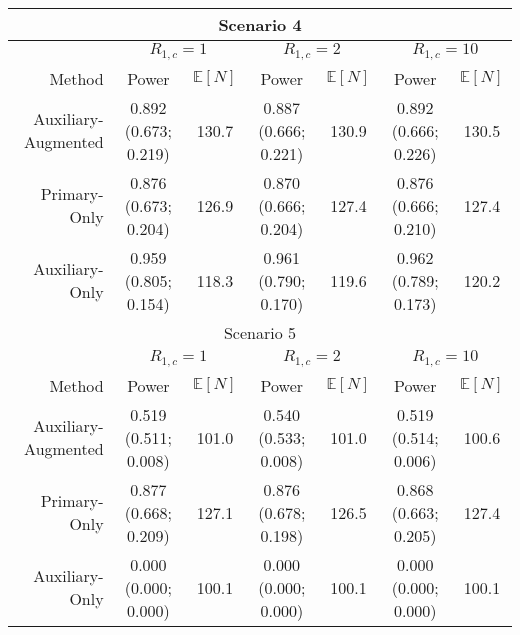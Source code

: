 \begin{tabular}{r|cc|cc|cc}
\bottomrule 
\multicolumn{7}{c}{Scenario 4}\\ 
\midrule 
& \multicolumn{2}{c}{$R_{1,c}= 1$} & \multicolumn{2}{c}{$R_{1,c} = 2$} & \multicolumn{2}{c}{$R_{1,c} = 10$} \\ 
Method &  Power &   $\mathbb E[N]$ &
               Power &   $\mathbb E[N]$ &
               Power &   $\mathbb E[N]$  \\ 
Auxiliary-Augmented &0.892  (0.673; 0.219) & 130.7 &0.887  (0.666; 0.221) & 130.9 &0.892  (0.666; 0.226) & 130.5 \\ 
Primary-Only &0.876  (0.673; 0.204) & 126.9 &0.870  (0.666; 0.204) & 127.4 &0.876  (0.666; 0.210) & 127.4 \\ 
Auxiliary-Only &0.959  (0.805; 0.154) & 118.3 &0.961  (0.790; 0.170) & 119.6 &0.962  (0.789; 0.173) & 120.2 \\ 
\bottomrule 
\multicolumn{7}{c}{Scenario 5}\\ 
\midrule 
& \multicolumn{2}{c}{$R_{1,c}= 1$} & \multicolumn{2}{c}{$R_{1,c} = 2$} & \multicolumn{2}{c}{$R_{1,c} = 10$} \\ 
Method &  Power &   $\mathbb E[N]$ &
               Power &   $\mathbb E[N]$ &
               Power &   $\mathbb E[N]$  \\ 
Auxiliary-Augmented &0.519  (0.511; 0.008) & 101.0 &0.540  (0.533; 0.008) & 101.0 &0.519  (0.514; 0.006) & 100.6 \\ 
Primary-Only &0.877  (0.668; 0.209) & 127.1 &0.876  (0.678; 0.198) & 126.5 &0.868  (0.663; 0.205) & 127.4 \\ 
Auxiliary-Only &0.000  (0.000; 0.000) & 100.1 &0.000  (0.000; 0.000) & 100.1 &0.000  (0.000; 0.000) & 100.1 \\ 
\bottomrule 
\end{tabular} 
